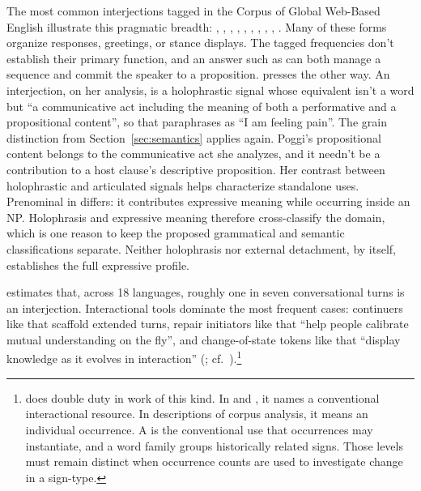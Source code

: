 \documentclass[12pt]{article}
\begin{document}
The most common interjections tagged in the Corpus of Global Web-Based English \citep[GloWbE;][]{daviesfuchs2015} illustrate this pragmatic breadth: , , , , , , , , , . Many of these forms organize responses, greetings, or stance displays. The tagged frequencies don't establish their primary function, and an answer such as  can both manage a sequence and commit the speaker to a proposition. \textcite[171]{poggi2009} presses the other way. An interjection, on her analysis, is a holophrastic signal whose equivalent isn't a word but \enquote{a communicative act including the meaning of both a performative and a propositional content}, so that  paraphrases as \enquote{I am feeling pain}. The grain distinction from Section~\ref{sec:semantics} applies again. Poggi's propositional content belongs to the communicative act she analyzes, and it needn't be a contribution to a host clause's descriptive proposition. Her contrast between holophrastic and articulated signals helps characterize standalone uses. Prenominal  in  differs: it contributes expressive meaning while occurring inside an NP. Holophrasis and expressive meaning therefore cross-classify the domain, which is one reason to keep the proposed grammatical and semantic classifications separate. Neither holophrasis nor external detachment, by itself, establishes the full expressive profile.

\textcite[257, 263]{dingemanse2024} estimates that, across 18 languages, roughly one in seven conversational turns is an interjection. Interactional tools dominate the most frequent cases: continuers like  that scaffold extended turns, repair initiators like  that \enquote{help people calibrate mutual understanding on the fly}, and change-of-state tokens like  that \enquote{display knowledge as it evolves in interaction} (\citealp[257]{dingemanse2024}; cf.\ \citealp[868, 870]{norrick2009}).\footnote{ does double duty in work of this kind. In  and , it names a conventional interactional resource. In descriptions of corpus analysis, it means an individual occurrence. A  is the conventional use that occurrences may instantiate, and a word family groups historically related signs. Those levels must remain distinct when occurrence counts are used to investigate change in a sign-type.}
\end{document}
